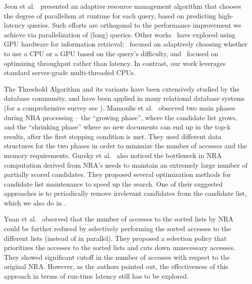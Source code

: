 Jeon et al.~\cite{Jeon:2014} 
presented an adaptive resource management algorithm that chooses the degree of parallelism at runtime for each query, based on predicting high-latency queries.
Such efforts are orthogonal to the performance improvement we achieve via parallelization of (long) queries.
Other works~\cite{Ao:2011,Liu:2018:GUC:3178487.3178512} have explored using GPU hardware for information retrieval;~\cite{Liu:2018:GUC:3178487.3178512} 
focused on adaptively choosing whether to use a CPU or a GPU based on the query's difficulty, and~\cite{Ao:2011} focused on optimizing throughput rather than latency. 
In contrast, our work leverages standard server-grade multi-threaded CPUs. 

The Threshold Algorithm and its variants \cite{Fagin:2003,Akbarinia:2007} have been extensively studied by the database community, and have been applied in many relational database systems (for a comprehensive survey see \cite{ilyas2008survey}). 
Mamoulis et al.~\cite{Mamoulis:2007} observed two main phases during NRA processing -- the ``growing phase'', where the candidate list grows, and the ``shrinking phase'' where no new documents can end up in the top-k results, after the first stopping condition is met. They used different data structures for the two phases in order to minimize the number of accesses and the memory requirements. 
Gursky et al.~\cite{Gursky:2008} also noticed the bottleneck in NRA computation derived from NRA's needs to maintain an extremely large number of partially scored candidates. They proposed several optimization methods for candidate list maintenance to speed up the search. One of their suggested approaches is to periodically remove irrelevant candidates from the candidate list, which we also do in \alg.

Yuan et al.~\cite{yuan:2012} observed that the number of accesses to the sorted lists by NRA could be further reduced by selectively performing the sorted accesses to the different lists (instead of in parallel). They proposed a selection policy that prioritizes the accesses to the sorted lists and cuts down unnecessary accesses. They showed significant cutoff in the number of accesses with respect to the original NRA. However, 
as the authors pointed out, the effectiveness of this approach in terms of run-time latency still has to be explored.

